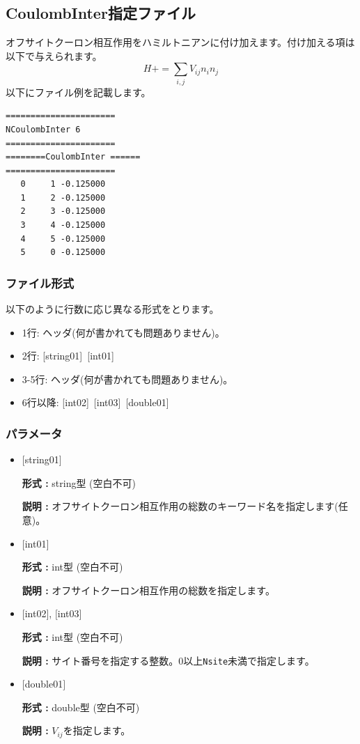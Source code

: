 \newpage
\subsection{CoulombInter指定ファイル}
オフサイトクーロン相互作用をハミルトニアンに付け加えます。付け加える項は以下で与えられます。
\begin{equation}
H+=\sum_{i,j}V_{ij} n_ {i}n_{j}
\end{equation}
以下にファイル例を記載します。

\begin{minipage}{12.5cm}
\begin{screen}
\begin{verbatim}
====================== 
NCoulombInter 6  
====================== 
========CoulombInter ====== 
====================== 
   0     1 -0.125000
   1     2 -0.125000
   2     3 -0.125000
   3     4 -0.125000
   4     5 -0.125000
   5     0 -0.125000
\end{verbatim}
\end{screen}
\end{minipage}

\subsubsection{ファイル形式}
以下のように行数に応じ異なる形式をとります。
 \begin{itemize}
   \item  1行:  ヘッダ(何が書かれても問題ありません)。
   \item  2行:   [string01]~[int01]
   \item  3-5行:  ヘッダ(何が書かれても問題ありません)。
   \item  6行以降:
   [int02]~[int03]~[double01] 
  \end{itemize}
\subsubsection{パラメータ}
 \begin{itemize}

   \item  $[$string01$]$
   
    {\bf 形式 :} string型 (空白不可)

   {\bf 説明 :} オフサイトクーロン相互作用の総数のキーワード名を指定します(任意)。

   \item  $[$int01$]$
   
    {\bf 形式 :} int型 (空白不可)

   {\bf 説明 :} オフサイトクーロン相互作用の総数を指定します。

  \item  $[$int02$]$, $[$int03$]$
  
 {\bf 形式 :} int型 (空白不可)

{\bf 説明 :} サイト番号を指定する整数。0以上\verb|Nsite|{未満}で指定します。
 
 \item  $[$double01$]$
   
   {\bf 形式 :} double型 (空白不可)

  {\bf 説明 :}  $V_{ij}$を指定します。
  
\end{itemize}

